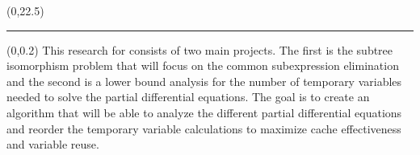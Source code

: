 \documentclass[landscape]{a0poster}
\def\Head#1{\noindent{\textbf{\LARGE\color{Red} #1}}\medskip}
\begin{document}

\begin{textblock}{30}(0,22.5)
	{\color{DarkBlue}\hrule}\medskip
	\Head{Methods} %

	\begin{textblock}{14}(0,0.2)
	This research for consists of two main projects. The first is the subtree isomorphism problem that will focus on the common subexpression elimination and the second is a lower bound analysis for the number of temporary variables needed to solve the partial differential equations. The goal is to create an algorithm that will be able to analyze the different partial differential equations and reorder the temporary variable calculations to maximize cache effectiveness and variable reuse. 


\end{textblock}




\end{textblock}
\end{document}
